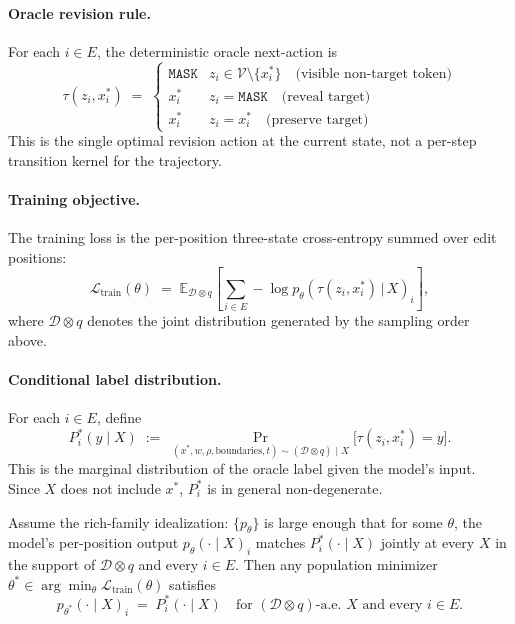 \documentclass{llmxive}
\providecommand{\xstar}{x^{\ast}}
\providecommand{\mask}{\texttt{MASK}}
\providecommand{\Ltrain}{\mathcal{L}_{\mathrm{train}}}
\begin{document}
\paragraph{Oracle revision rule.}
For each $i \in E$, the deterministic oracle next-action is
\begin{equation}
\tau(z_i, \xstar_i) \;=\; \begin{cases}
\mask & z_i \in \mathcal{V} \setminus \{\xstar_i\} \quad \text{(visible non-target token)} \\
\xstar_i & z_i = \mask \quad \text{(reveal target)} \\
\xstar_i & z_i = \xstar_i \quad \text{(preserve target)}
\end{cases}
\label{eq:oracle-tau}
\end{equation}
This is the single optimal revision action at the current state, not a per-step transition kernel for the trajectory.

\paragraph{Training objective.}
The training loss is the per-position three-state cross-entropy summed over edit positions:
\begin{equation}
\Ltrain(\theta) \;=\; \mathbb{E}_{\mathcal{D} \otimes q}\!\left[\sum_{i \in E} -\log p_\theta\!\left(\tau(z_i, \xstar_i) \,\big|\, X\right)_i\right],
\label{eq:rm-loss}
\end{equation}
where $\mathcal{D} \otimes q$ denotes the joint distribution generated by the sampling order above.

\paragraph{Conditional label distribution.}
For each $i \in E$, define
\begin{equation}
P^*_i(y \mid X) \;:=\; \Pr_{(\xstar, w, \rho, \mathrm{boundaries}, t) \sim (\mathcal{D} \otimes q) \mid X}\!\big[\tau(z_i, \xstar_i) = y\big].
\label{eq:Pstar-def}
\end{equation}
This is the marginal distribution of the oracle label given the model's input. Since $X$ does not include $\xstar$, $P^*_i$ is in general non-degenerate.

\begin{theorem}
\label{thm:bayes-consistency}
Assume the rich-family idealization: $\{p_\theta\}$ is large enough that for some $\theta$, the model's per-position output $p_\theta(\cdot \mid X)_i$ matches $P^*_i(\cdot \mid X)$ jointly at every $X$ in the support of $\mathcal{D} \otimes q$ and every $i \in E$. Then any population minimizer $\theta^* \in \arg\min_\theta \Ltrain(\theta)$ satisfies
\[
p_{\theta^*}(\cdot \mid X)_i \;=\; P^*_i(\cdot \mid X) \quad \text{for } (\mathcal{D} \otimes q)\text{-a.e.\ } X \text{ and every } i \in E.
\]
\end{theorem}
\end{document}
